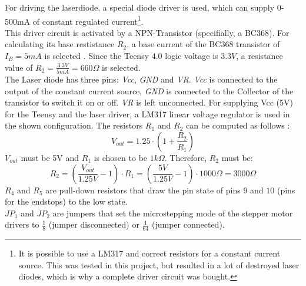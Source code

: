 \documentclass[a4paper, 11pt]{scrartcl}
\begin{document}
For driving the laserdiode, a special diode driver is used, which can supply 0-500mA of constant regulated current\footnote{It is possible to use a LM317 and correct resistors for a constant current source. This was tested in this project, but resulted in a lot of destroyed laser diodes, which is why a complete driver circuit was bought.}. \\
This driver circuit is activated by a NPN-Transistor (specifially, a BC368). For calculating its base restistance $R_2$, a base current of the BC368 transistor of $I_B=5mA$ is selected \cite[p. 3]{SemiconductorComponentsIndustries.2007}. Since the Teensy 4.0 logic voltage is $3.3V$, a resistance value of $R_2=\frac{3.3V}{5mA}=660\Omega$ is selected. \\
The Laser diode has three pins: \textit{Vcc}, \textit{GND} and \textit{VR}. \textit{Vcc} is connected to the output of the constant current source, \textit{GND} is connected to the Collector of the transistor to switch it on or off. \textit{VR} is left unconnected. 
For supplying Vcc (5V) for the Teensy and the laser driver, a LM317 linear voltage regulator is used in the shown configuration. The resistors $R_1$ and $R_2$ can be computed as follows \cite[p. 10]{lm317}: 
\begin{equation}
V_{out} = 1.25 \cdot \left( 1+\frac{R_2}{R_1} \right)
\end{equation}
$V_{out}$ must be 5V and $R_1$ is chosen to be $1k\Omega$. Therefore, $R_2$ must be:
\begin{equation}
R_2 = \left( \frac{V_{out}}{1.25V} - 1 \right) \cdot R_1 =  \left( \frac{5V}{1.25V} - 1 \right) \cdot 1000\Omega = 3000\Omega
\end{equation}
$R_4$ and $R_5$ are pull-down resistors that draw the pin state of pins $9$ and $10$ (pins for the endstops) to the low state. \\
$JP_1$ and $JP_2$ are jumpers that set the microstepping mode of the stepper motor drivers to $\frac{1}{8}$ (jumper disconnected) or $\frac{1}{64}$ (jumper connected).
\end{document}

